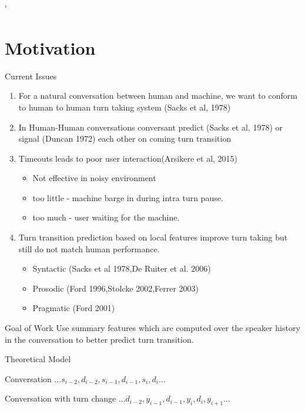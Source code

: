 `%

\section{Motivation}
\frame{\sectionpage}

\begin{frame}{Current Issues}
    \begin{enumerate}[<+->]\itemsep9pt
      \item For a natural conversation between human and machine, we want to conform
            to human to human turn taking system (Sacks et al, 1978)
      \item In Human-Human conversations conversant predict (Sacks et al, 1978) or
            signal (Duncan 1972) each other on coming turn transition
      \item {
        Timeouts leads to poor user interaction(Arsikere et al, 2015)
        \begin{itemize}
            \item Not effective in noisy environment
            \item too little - machine barge in during intra turn pause.
            \item too much - user waiting for the machine.
        \end{itemize}
      }
      \item {
        Turn transition prediction based on local features improve turn taking but still
        do not match human performance.
        \begin{itemize}
            \item Syntactic (Sacks et al 1978,De Ruiter et al. 2006)
            \item Prosodic (Ford 1996,Stolcke 2002,Ferrer 2003)
            \item Pragmatic (Ford 2001)
        \end{itemize}
      }
    \end{enumerate}
\end{frame}

\begin{frame} {Goal of Work}
        Use summary features which are computed over the speaker history in
        the conversation to better predict turn transition.
\end{frame}

\begin{frame}{Theoretical Model}


  \begin{alertblock}{Conversation}
    { $\ldots  s_{i-2}, d_{i-2}, s_{i-1} , d_{i-1}, s_i, d_i  \ldots$  }
  \end{alertblock}
  \begin{alertblock}{Conversation with turn change}
     $\ldots d_{i-2}, y_{i-1}, d_{i-1}, y_{i} , d_i, y_{i+1}\ldots$
  \end{alertblock}
\end{frame}


